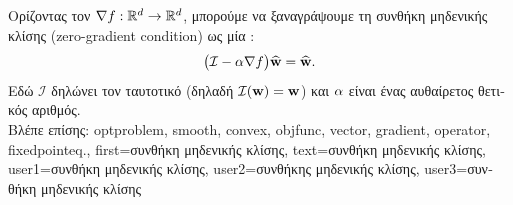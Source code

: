 {{		\foreignlanguage{greek}{Ορίζοντας τον}   
		$\nabla f: \mathbb{R}^{d} \rightarrow \mathbb{R}^{d}$, \foreignlanguage{greek}{μπορούμε να ξαναγράψουμε
		τη συνθήκη μηδενικής κλίσης} (zero-gradient condition) \foreignlanguage{greek}{ως μία} :
		$$ \big( \mathcal{I} - \alpha \nabla f\big) \widehat{{\bf w}} = \widehat{{\bf w}}.$$ 
		\foreignlanguage{greek}{Εδώ $\mathcal{I}$ δηλώνει τον ταυτοτικό}  \foreignlanguage{greek}{(δηλαδή 
		$\mathcal{I}({\bf w}) = {\bf w}$) και $\alpha$ είναι ένας αυθαίρετος θετικός αριθμός}. 
		\\
		\foreignlanguage{greek}{Βλέπε επίσης:} \gls{optproblem}, \gls{smooth}, \gls{convex}, \gls{objfunc}, \gls{vector}, \gls{gradient}, 
		\gls{operator}, \gls{fixedpointeq}.}, 
	first={\foreignlanguage{greek}{συνθήκη μηδενικής κλίσης}},
	text={\foreignlanguage{greek}{συνθήκη μηδενικής κλίσης}},
	user1={\foreignlanguage{greek}{συνθήκη μηδενικής κλίσης}}, %
	user2={\foreignlanguage{greek}{συνθήκης μηδενικής κλίσης}}, %
	user3={\foreignlanguage{greek}{συνθήκη μηδενικής κλίσης}} %
}

